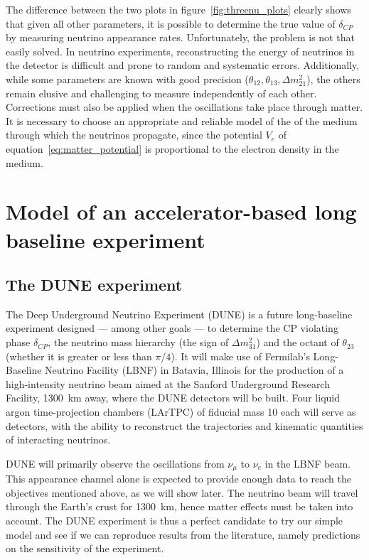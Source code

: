 The difference between the two plots in figure~\ref{fig:threenu_plots} clearly
shows that given all other parameters, it is possible to determine the true
value of $\delta_{CP}$ by measuring neutrino appearance rates. Unfortunately,
the problem is not that easily solved. In neutrino experiments, reconstructing
the energy of neutrinos in the detector is difficult and prone to random and
systematic errors. Additionally, while some parameters are known with good
precision ($\theta_{12}, \theta_{13}, \Delta m^2_{21}$), the others remain
elusive and challenging to measure independently of each other.
Corrections must also be applied when the oscillations take place
through matter. It is necessary to choose an appropriate and reliable model of the
of the medium through which the neutrinos propagate, since the potential $V_e$ of
equation~\ref{eq:matter_potential} is proportional to the electron density in
the medium.


\section{Model of an accelerator-based long baseline experiment}

\subsection{The DUNE experiment}
The Deep Underground Neutrino Experiment\cite{cdr} (DUNE) is a future long-baseline
experiment designed --- among other goals --- to determine the CP violating phase
$\delta_{CP}$, the neutrino mass hierarchy (the sign of $\Delta m^2_{31}$) and
the octant of $\theta_{23}$ (whether it is greater or less than 
$\pi/4$). 
It will make use of Fermilab's Long-Baseline Neutrino Facility (LBNF) in Batavia,
Illinois for the production of a high-intensity neutrino beam aimed at the
Sanford Underground Research Facility, \SI{1300}{\km} away, where the DUNE
detectors will be built.
Four liquid argon time-projection chambers (LArTPC) of fiducial mass
\SI{10}{\kt} each will serve as detectors, with the ability to reconstruct the
trajectories and kinematic quantities of interacting neutrinos.

DUNE will primarily observe the oscillations from $\nu_\mu$ to $\nu_e$ in the
LBNF beam. This appearance channel alone is expected to provide enough data to
reach the objectives mentioned above, as we will show later.
The neutrino beam will travel through the Earth's crust for \SI{1300}{\km},
hence matter effects must be taken into account.
The DUNE experiment is thus a perfect candidate to try our simple model and see
if we can reproduce results from the literature, namely predictions on the
sensitivity of the experiment.

